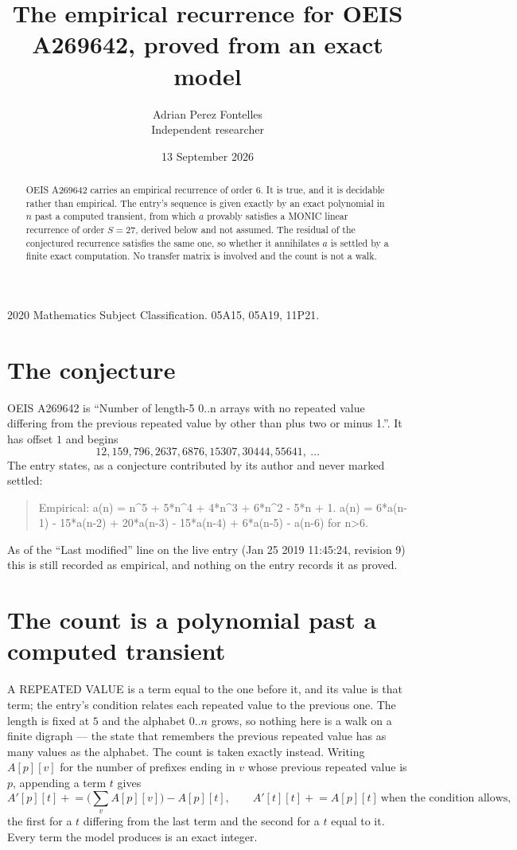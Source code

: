 \documentclass[11pt,a4paper]{article}
\title{The empirical recurrence for OEIS A269642, proved from an exact model}
\author{Adrian Perez Fontelles\\ \small Independent researcher}
\date{13 September 2026}
\theoremstyle{plain}
\theoremstyle{definition}
\begin{document}
\maketitle

\begin{abstract}
OEIS A269642 carries an empirical recurrence of order $6$. It is true, and it is
decidable rather than empirical. The entry's sequence is given exactly by an exact polynomial in $n$ past a computed transient, from
which $a$ provably satisfies a MONIC linear recurrence of order $S=27$, derived below and not
assumed. The residual of the conjectured recurrence satisfies the same one, so whether it
annihilates $a$ is settled by a finite exact computation. No transfer matrix is involved and
the count is not a walk.
\end{abstract}

\noindent\small 2020 Mathematics Subject Classification. 05A15, 05A19, 11P21.\normalsize

\section{The conjecture}

OEIS A269642 is ``Number of length-5 0..n arrays with no repeated value differing from the previous repeated value by other than plus two or minus 1.''. It has offset $1$ and begins
\[
12, 159, 796, 2637, 6876, 15307, 30444, 55641,\ \dots
\]
The entry states, as a conjecture contributed by its author and never marked settled:
\begin{quote}
Empirical: a(n) = n\^{}5 + 5*n\^{}4 + 4*n\^{}3 + 6*n\^{}2 - 5*n + 1. a(n) = 6*a(n-1) - 15*a(n-2) + 20*a(n-3) - 15*a(n-4) + 6*a(n-5) - a(n-6) for n>6.
\end{quote}
As of the ``Last modified'' line on the live entry (Jan 25 2019 11:45:24, revision 9)
this is still recorded as empirical, and nothing on the entry records it as proved.

\section{The count is a polynomial past a computed transient}

A REPEATED VALUE is a term equal to the one before it, and its value is that term; the entry's
condition relates each repeated value to the previous one. The length is fixed at $5$ and the
alphabet $0..n$ grows, so nothing here is a walk on a finite digraph --- the state that
remembers the previous repeated value has as many values as the alphabet. The count is taken
exactly instead. Writing $A[p][v]$ for the number of prefixes ending in $v$ whose previous
repeated value is $p$, appending a term $t$ gives
\[
A'[p][t] \mathrel{+}= \Big(\sum_v A[p][v]\Big) - A[p][t],
\qquad
A'[t][t] \mathrel{+}= A[p][t]\ \text{when the condition allows},
\]
the first for a $t$ differing from the last term and the second for a $t$ equal to it. Every
term the model produces is an exact integer.
\end{document}
